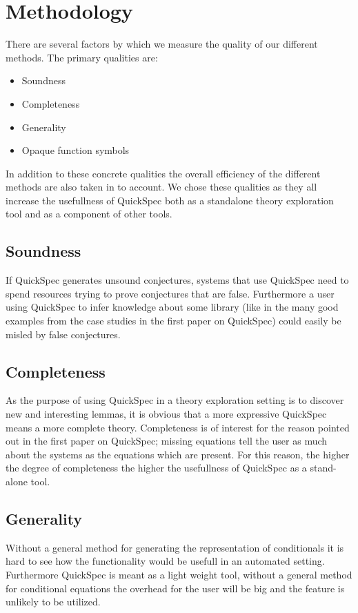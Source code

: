 \section{Methodology}
There are several factors by which we measure the quality of our different methods.
The primary qualities are:

\begin{itemize}

    \item Soundness
    \item Completeness
    \item Generality
    \item Opaque function symbols

\end{itemize}

In addition to these concrete qualities the overall efficiency of the different methods are also
taken in to account.
We chose these qualities as they all increase the usefullness
of QuickSpec both as a standalone theory exploration tool
and as a component of other tools.

    \subsection{Soundness}
    If QuickSpec generates unsound conjectures, systems that use QuickSpec
    need to spend resources trying to prove conjectures that are false. Furthermore
    a user using QuickSpec to infer knowledge about some library (like in the many
    good examples from the case studies in the first paper on QuickSpec) could easily
    be misled by false conjectures.

    \subsection{Completeness}
    As the purpose of using QuickSpec in a theory exploration setting is to discover
    new and interesting lemmas, it is obvious that a more expressive QuickSpec means a more
    complete theory. %
    Completeness is of interest for the reason pointed out in the first paper on QuickSpec; %
    missing equations tell the user as much about the systems as the equations which are
    present. For this reason, the higher the degree of completeness the higher the usefullness
    of QuickSpec as a stand-alone tool. 

    \subsection{Generality}
    Without a general method for generating the representation of conditionals
    it is hard to see how the functionality would be usefull in an automated setting.
    Furthermore QuickSpec is meant as a light weight tool, without a general method
    for conditional equations the overhead for the user will be big and the feature
    is unlikely to be utilized.

